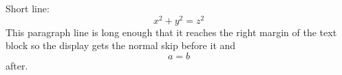\documentclass[10pt,fleqn]{article}
\begin{document}
Short line:
\begin{equation} x^2 + y^2 = z^2 \end{equation}
This paragraph line is long enough that it reaches the right margin of the text block so the display gets the normal skip before it and
\[ a = b \]
after.
\end{document}

